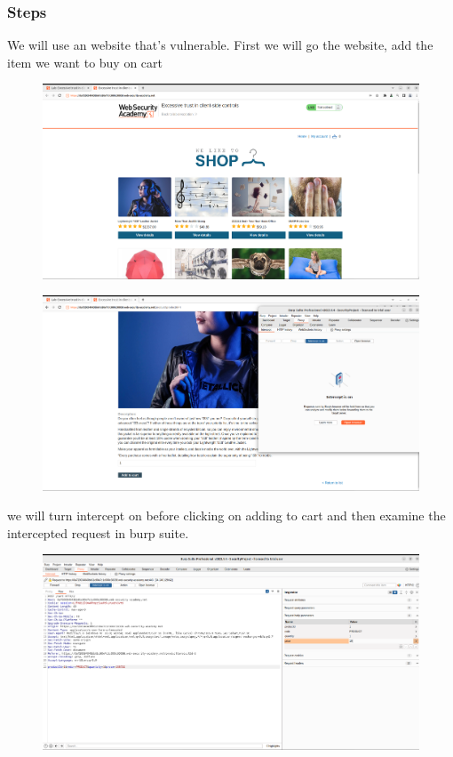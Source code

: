 \documentclass[
	a4paper, %
	12pt, %
]{CSSullivanBusinessReport}
\begin{document}
\subsubsection*{Steps}
\begin{fullwidth}
    

We will use an website that's vulnerable. First we will go the website, add the item we want to buy on cart

\begin{figure}[H]
    \centering
    \includegraphics[width=1\textwidth]{Images/anikaScreensots/lab1.png}

\end{figure}

\begin{figure}[H]
    \centering
    \includegraphics[width=1\textwidth]{Images/anikaScreensots/lab2.png}

\end{figure}

we will turn intercept on before clicking on adding to cart and then examine the intercepted request in burp suite.

\begin{figure}[H]
    \centering
    \includegraphics[width=1\textwidth]{Images/anikaScreensots/lab3.png}


\end{figure}
\end{fullwidth}
\end{document}
